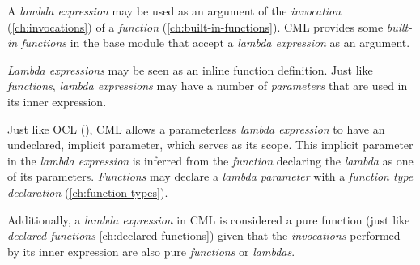 A \emph{lambda expression} may be used
as an argument of the \emph{invocation} (\ref{ch:invocations})
of a \emph{function} (\ref{ch:built-in-functions}).
CML provides some \emph{built-in functions} in the base module
that accept a \emph{lambda expression} as an argument.

\emph{Lambda expressions} may be seen as an inline function definition.
Just like \emph{functions},
\emph{lambda expressions} may have a number of \emph{parameters}
that are used in its inner expression.

Just like OCL (\cite{ocl}),
CML allows a parameterless \emph{lambda expression}
to have an undeclared, implicit parameter,
which serves as its scope.
This implicit parameter in the \emph{lambda expression}
is inferred from the \emph{function}
declaring the \emph{lambda} as one of its parameters.
\emph{Functions} may declare a \emph{lambda parameter}
with a \emph{function type declaration} (\ref{ch:function-types}).

Additionally, a \emph{lambda expression} in CML is considered
a pure function (just like \emph{declared functions} \ref{ch:declared-functions})
given that the \emph{invocations} performed by its inner expression
are also pure \emph{functions} or \emph{lambdas}.

